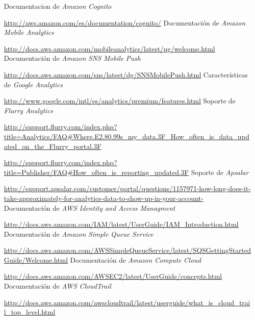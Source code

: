 \documentclass{article}
\begin{document}
\renewcommand{\bibname}{Referencias}
\begin{thebibliography}{99}
Documentacion de \emph{Amazon Cognito}

\url{http://aws.amazon.com/es/documentation/cognito/}
Documentación de \emph{Amazon Mobile Analytics}

\url{http://docs.aws.amazon.com/mobileanalytics/latest/ug/welcome.html}
Documentación de \emph{Amazon SNS Mobile Push}

\url{http://docs.aws.amazon.com/sns/latest/dg/SNSMobilePush.html}
Características de \emph{Google Analytics}

\url{http://www.google.com/intl/es/analytics/premium/features.html}
Soporte de \emph{Flurry Analytics}

\url{http://support.flurry.com/index.php?title=Analytics/FAQ#Where.E2.80.99s_my_data.3F_How_often_is_data_updated_on_the_Flurry_portal.3F}

\url{http://support.flurry.com/index.php?title=Publisher/FAQ#How_often_is_reporting_updated.3F}
Soporte de \emph{Apsalar}

\url{http://support.apsalar.com/customer/portal/questions/1157971-how-long-does-it-take-approximately-for-analytics-data-to-show-up-in-your-account-}
Documentación de \emph{AWS Identity and Access Managment}

\url{http://docs.aws.amazon.com/IAM/latest/UserGuide/IAM_Introduction.html}
Documentación de \emph{Amazon Simple Queue Service}

\url{http://docs.aws.amazon.com/AWSSimpleQueueService/latest/SQSGettingStartedGuide/Welcome.html}
Documentación de \emph{Amazon Compute Cloud}

\url{http://docs.aws.amazon.com/AWSEC2/latest/UserGuide/concepts.html}
Documentación de \emph{AWS CloudTrail}

\url{http://docs.aws.amazon.com/awscloudtrail/latest/userguide/what_is_cloud_trail_top_level.html}

\end{thebibliography}
\end{document}
